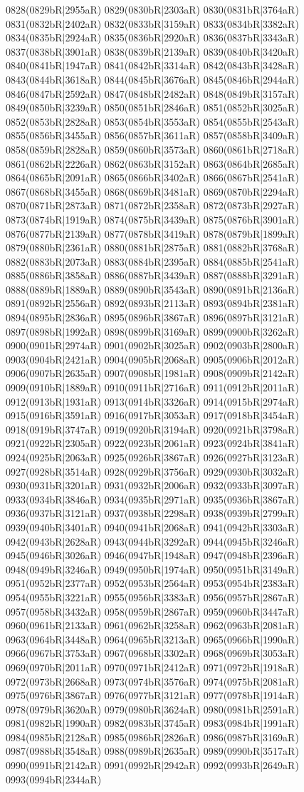 0828(0829bR|2955aR) 0829(0830bR|2303aR) 0830(0831bR|3764aR) 0831(0832bR|2402aR) 0832(0833bR|3159aR) 0833(0834bR|3382aR) 0834(0835bR|2924aR) 0835(0836bR|2920aR) 0836(0837bR|3343aR) 0837(0838bR|3901aR) 0838(0839bR|2139aR) 0839(0840bR|3420aR) 0840(0841bR|1947aR) 0841(0842bR|3314aR) 0842(0843bR|3428aR) 0843(0844bR|3618aR) 0844(0845bR|3676aR) 0845(0846bR|2944aR) 0846(0847bR|2592aR) 0847(0848bR|2482aR) 0848(0849bR|3157aR) 0849(0850bR|3239aR) 0850(0851bR|2846aR) 0851(0852bR|3025aR) 0852(0853bR|2828aR) 0853(0854bR|3553aR) 0854(0855bR|2543aR) 0855(0856bR|3455aR) 0856(0857bR|3611aR) 0857(0858bR|3409aR) 0858(0859bR|2828aR) 0859(0860bR|3573aR) 0860(0861bR|2718aR) 0861(0862bR|2226aR) 0862(0863bR|3152aR) 0863(0864bR|2685aR) 0864(0865bR|2091aR) 0865(0866bR|3402aR) 0866(0867bR|2541aR) 0867(0868bR|3455aR) 0868(0869bR|3481aR) 0869(0870bR|2294aR) 0870(0871bR|2873aR) 0871(0872bR|2358aR) 0872(0873bR|2927aR) 0873(0874bR|1919aR) 0874(0875bR|3439aR) 0875(0876bR|3901aR) 0876(0877bR|2139aR) 0877(0878bR|3419aR) 0878(0879bR|1899aR) 0879(0880bR|2361aR) 0880(0881bR|2875aR) 0881(0882bR|3768aR) 0882(0883bR|2073aR) 0883(0884bR|2395aR) 0884(0885bR|2541aR) 0885(0886bR|3858aR) 0886(0887bR|3439aR) 0887(0888bR|3291aR) 0888(0889bR|1889aR) 0889(0890bR|3543aR) 0890(0891bR|2136aR) 0891(0892bR|2556aR) 0892(0893bR|2113aR) 0893(0894bR|2381aR) 0894(0895bR|2836aR) 0895(0896bR|3867aR) 0896(0897bR|3121aR) 0897(0898bR|1992aR) 0898(0899bR|3169aR) 0899(0900bR|3262aR) 0900(0901bR|2974aR) 0901(0902bR|3025aR) 0902(0903bR|2800aR) 0903(0904bR|2421aR) 0904(0905bR|2068aR) 0905(0906bR|2012aR) 0906(0907bR|2635aR) 0907(0908bR|1981aR) 0908(0909bR|2142aR) 0909(0910bR|1889aR) 0910(0911bR|2716aR) 0911(0912bR|2011aR) 0912(0913bR|1931aR) 0913(0914bR|3326aR) 0914(0915bR|2974aR) 0915(0916bR|3591aR) 0916(0917bR|3053aR) 0917(0918bR|3454aR) 0918(0919bR|3747aR) 0919(0920bR|3194aR) 0920(0921bR|3798aR) 0921(0922bR|2305aR) 0922(0923bR|2061aR) 0923(0924bR|3841aR) 0924(0925bR|2063aR) 0925(0926bR|3867aR) 0926(0927bR|3123aR) 0927(0928bR|3514aR) 0928(0929bR|3756aR) 0929(0930bR|3032aR) 0930(0931bR|3201aR) 0931(0932bR|2006aR) 0932(0933bR|3097aR) 0933(0934bR|3846aR) 0934(0935bR|2971aR) 0935(0936bR|3867aR) 0936(0937bR|3121aR) 0937(0938bR|2298aR) 0938(0939bR|2799aR) 0939(0940bR|3401aR) 0940(0941bR|2068aR) 0941(0942bR|3303aR) 0942(0943bR|2628aR) 0943(0944bR|3292aR) 0944(0945bR|3246aR) 0945(0946bR|3026aR) 0946(0947bR|1948aR) 0947(0948bR|2396aR) 0948(0949bR|3246aR) 0949(0950bR|1974aR) 0950(0951bR|3149aR) 0951(0952bR|2377aR) 0952(0953bR|2564aR) 0953(0954bR|2383aR) 0954(0955bR|3221aR) 0955(0956bR|3383aR) 0956(0957bR|2867aR) 0957(0958bR|3432aR) 0958(0959bR|2867aR) 0959(0960bR|3447aR) 0960(0961bR|2133aR) 0961(0962bR|3258aR) 0962(0963bR|2081aR) 0963(0964bR|3448aR) 0964(0965bR|3213aR) 0965(0966bR|1990aR) 0966(0967bR|3753aR) 0967(0968bR|3302aR) 0968(0969bR|3053aR) 0969(0970bR|2011aR) 0970(0971bR|2412aR) 0971(0972bR|1918aR) 0972(0973bR|2668aR) 0973(0974bR|3576aR) 0974(0975bR|2081aR) 0975(0976bR|3867aR) 0976(0977bR|3121aR) 0977(0978bR|1914aR) 0978(0979bR|3620aR) 0979(0980bR|3624aR) 0980(0981bR|2591aR) 0981(0982bR|1990aR) 0982(0983bR|3745aR) 0983(0984bR|1991aR) 0984(0985bR|2128aR) 0985(0986bR|2826aR) 0986(0987bR|3169aR) 0987(0988bR|3548aR) 0988(0989bR|2635aR) 0989(0990bR|3517aR) 0990(0991bR|2142aR) 0991(0992bR|2942aR) 0992(0993bR|2649aR) 0993(0994bR|2344aR) 